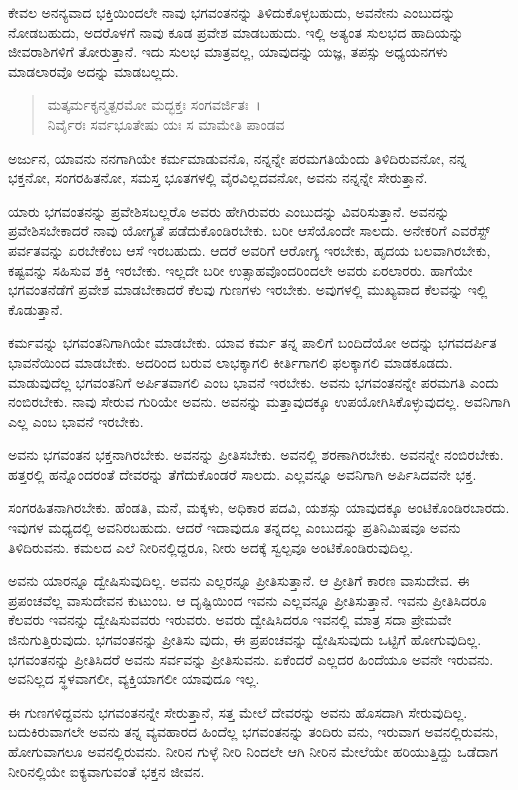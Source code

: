 ಕೇವಲ ಅನನ್ಯವಾದ ಭಕ್ತಿಯಿಂದಲೇ ನಾವು ಭಗವಂತನನ್ನು ತಿಳಿದುಕೊಳ್ಳಬಹುದು, ಅವನೇನು ಎಂಬುದನ್ನು ನೋಡಬಹುದು, ಅದರೊಳಗೆ ನಾವು ಕೂಡ ಪ್ರವೇಶ ಮಾಡಬಹುದು. ಇಲ್ಲಿ ಅತ್ಯಂತ ಸುಲಭದ ಹಾದಿಯನ್ನು ಜೀವರಾಶಿಗಳಿಗೆ ತೋರುತ್ತಾನೆ. ಇದು ಸುಲಭ ಮಾತ್ರವಲ್ಲ, ಯಾವುದನ್ನು ಯಜ್ಞ, ತಪಸ್ಸು ಅಧ್ಯಯನಗಳು ಮಾಡಲಾರವೊ ಅದನ್ನು ಮಾಡಬಲ್ಲದು.

\begin{verse}
ಮತ್ಕರ್ಮಕೃನ್ಮತ್ಪರಮೋ ಮದ್ಭಕ್ತಃ ಸಂಗವರ್ಜಿತಃ~।\\ನಿರ್ವೈರಃ ಸರ್ವಭೂತೇಷು ಯಃ ಸ ಮಾಮೇತಿ ಪಾಂಡವ 
\end{verse}

{\small ಅರ್ಜುನ, ಯಾವನು ನನಗಾಗಿಯೇ ಕರ್ಮಮಾಡುವನೊ, ನನ್ನನ್ನೇ ಪರಮಗತಿಯೆಂದು ತಿಳಿದಿರುವನೋ, ನನ್ನ ಭಕ್ತನೋ, ಸಂಗರಹಿತನೋ, ಸಮಸ್ತ ಭೂತಗಳಲ್ಲಿ ವೈರವಿಲ್ಲದವನೋ, ಅವನು ನನ್ನನ್ನೇ ಸೇರುತ್ತಾನೆ.}

ಯಾರು ಭಗವಂತನನ್ನು ಪ್ರವೇಶಿಸಬಲ್ಲರೊ ಅವರು ಹೇಗಿರುವರು ಎಂಬುದನ್ನು ವಿವರಿಸುತ್ತಾನೆ. ಅವನನ್ನು ಪ್ರವೇಶಿಸಬೇಕಾದರೆ ನಾವು ಯೋಗ್ಯತೆ ಪಡೆದುಕೊಂಡಿರಬೇಕು. ಬರೀ ಆಸೆಯೊಂದೇ ಸಾಲದು. ಅನೇಕರಿಗೆ ಎವರೆಸ್ಟ್ ಪರ್ವತವನ್ನು ಏರಬೇಕೆಂಬ ಆಸೆ ಇರಬಹುದು. ಆದರೆ ಅವರಿಗೆ ಆರೋಗ್ಯ ಇರಬೇಕು, ಹೃದಯ ಬಲವಾಗಿರಬೇಕು, ಕಷ್ಟವನ್ನು ಸಹಿಸುವ ಶಕ್ತಿ ಇರಬೇಕು. ಇಲ್ಲದೇ ಬರೀ ಉತ್ಸಾಹವೊಂದರಿಂದಲೇ ಅವರು ಏರಲಾರರು. ಹಾಗೆಯೇ ಭಗವಂತನೆಡೆಗೆ ಪ್ರವೇಶ ಮಾಡಬೇಕಾದರೆ ಕೆಲವು ಗುಣಗಳು ಇರಬೇಕು. ಅವುಗಳಲ್ಲಿ ಮುಖ್ಯವಾದ ಕೆಲವನ್ನು ಇಲ್ಲಿ ಕೊಡುತ್ತಾನೆ.

ಕರ್ಮವನ್ನು ಭಗವಂತನಿಗಾಗಿಯೇ ಮಾಡಬೇಕು. ಯಾವ ಕರ್ಮ ತನ್ನ ಪಾಲಿಗೆ ಬಂದಿದೆಯೋ ಅದನ್ನು ಭಗವದರ್ಪಿತ ಭಾವನೆಯಿಂದ ಮಾಡಬೇಕು. ಅದರಿಂದ ಬರುವ ಲಾಭಕ್ಕಾಗಲಿ ಕೀರ್ತಿಗಾಗಲಿ ಫಲಕ್ಕಾಗಲಿ ಮಾಡಕೂಡದು. ಮಾಡುವುದೆಲ್ಲ ಭಗವಂತನಿಗೆ ಅರ್ಪಿತವಾಗಲಿ ಎಂಬ ಭಾವನೆ ಇರಬೇಕು. ಅವನು ಭಗವಂತನನ್ನೇ ಪರಮಗತಿ ಎಂದು ನಂಬಿರಬೇಕು. ನಾವು ಸೇರುವ ಗುರಿಯೇ ಅವನು. ಅವನನ್ನು ಮತ್ತಾವುದಕ್ಕೂ ಉಪಯೋಗಿಸಿಕೊಳ್ಳುವುದಲ್ಲ. ಅವನಿಗಾಗಿ ಎಲ್ಲ ಎಂಬ ಭಾವನೆ ಇರಬೇಕು.

ಅವನು ಭಗವಂತನ ಭಕ್ತನಾಗಿರಬೇಕು. ಅವನನ್ನು ಪ್ರೀತಿಸಬೇಕು. ಅವನಲ್ಲಿ ಶರಣಾಗಿರಬೇಕು. ಅವನನ್ನೇ ನಂಬಿರಬೇಕು. ಹತ್ತರಲ್ಲಿ ಹನ್ನೊಂದರಂತೆ ದೇವರನ್ನು ತೆಗೆದುಕೊಂಡರೆ ಸಾಲದು. ಎಲ್ಲವನ್ನೂ ಅವನಿಗಾಗಿ ಅರ್ಪಿಸಿದವನೇ ಭಕ್ತ.

ಸಂಗರಹಿತನಾಗಿರಬೇಕು. ಹೆಂಡತಿ, ಮನೆ, ಮಕ್ಕಳು, ಅಧಿಕಾರ ಪದವಿ, ಯಶಸ್ಸು ಯಾವುದಕ್ಕೂ ಅಂಟಿಕೊಂಡಿರಬಾರದು. ಇವುಗಳ ಮಧ್ಯದಲ್ಲಿ ಅವನಿರಬಹುದು. ಆದರೆ ಇದಾವುದೂ ತನ್ನದಲ್ಲ ಎಂಬುದನ್ನು ಪ್ರತಿನಿಮಿಷವೂ ಅವನು ತಿಳಿದಿರುವನು. ಕಮಲದ ಎಲೆ ನೀರಿನಲ್ಲಿದ್ದರೂ, ನೀರು ಅದಕ್ಕೆ ಸ್ವಲ್ಪವೂ ಅಂಟಿಕೊಂಡಿರುವುದಿಲ್ಲ.

ಅವನು ಯಾರನ್ನೂ ದ್ವೇಷಿಸುವುದಿಲ್ಲ. ಅವನು ಎಲ್ಲರನ್ನೂ ಪ್ರೀತಿಸುತ್ತಾನೆ. ಆ ಪ್ರೀತಿಗೆ ಕಾರಣ ವಾಸುದೇವ. ಈ ಪ್ರಪಂಚವೆಲ್ಲ ವಾಸುದೇವನ ಕುಟುಂಬ. ಆ ದೃಷ್ಟಿಯಿಂದ ಇವನು ಎಲ್ಲವನ್ನೂ ಪ್ರೀತಿಸುತ್ತಾನೆ. ಇವನು ಪ್ರೀತಿಸಿದರೂ ಕೆಲವರು ಇವನನ್ನು ದ್ವೇಷಿಸುವವರು ಇರುವರು. ಅವರು ದ್ವೇಷಿಸಿದರೂ ಇವನಲ್ಲಿ ಮಾತ್ರ ಸದಾ ಪ್ರೇಮವೇ ಜಿನುಗುತ್ತಿರುವುದು. ಭಗವಂತನನ್ನು ಪ್ರೀತಿಸು ವುದು, ಈ ಪ್ರಪಂಚವನ್ನು ದ್ವೇಷಿಸುವುದು ಒಟ್ಟಿಗೆ ಹೋಗುವುದಿಲ್ಲ. ಭಗವಂತನನ್ನು ಪ್ರೀತಿಸಿದರೆ ಅವನು ಸರ್ವವನ್ನು ಪ್ರೀತಿಸುವನು. ಏಕೆಂದರೆ ಎಲ್ಲದರ ಹಿಂದೆಯೂ ಅವನೇ ಇರುವನು. ಅವನಿಲ್ಲದ ಸ್ಥಳವಾಗಲೀ, ವ್ಯಕ್ತಿಯಾಗಲೀ ಯಾವುದೂ ಇಲ್ಲ.

ಈ ಗುಣಗಳಿದ್ದವನು ಭಗವಂತನನ್ನೇ ಸೇರುತ್ತಾನೆ, ಸತ್ತ ಮೇಲೆ ದೇವರನ್ನು ಅವನು ಹೊಸದಾಗಿ ಸೇರುವುದಿಲ್ಲ. ಬದುಕಿರುವಾಗಲೇ ಅವನು ತನ್ನ ವ್ಯವಹಾರದ ಹಿಂದೆಲ್ಲ ಭಗವಂತನನ್ನು ತಂದಿರು ವನು, ಇರುವಾಗ ಅವನಲ್ಲಿರುವನು, ಹೋಗುವಾಗಲೂ ಅವನಲ್ಲಿರುವನು. ನೀರಿನ ಗುಳ್ಳೆ ನೀರಿ ನಿಂದಲೇ ಆಗಿ ನೀರಿನ ಮೇಲೆಯೇ ಹರಿಯುತ್ತಿದ್ದು ಒಡೆದಾಗ ನೀರಿನಲ್ಲಿಯೇ ಐಕ್ಯವಾಗುವಂತೆ ಭಕ್ತನ ಜೀವನ.

